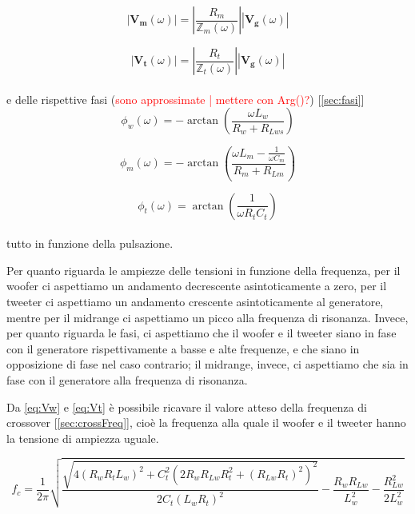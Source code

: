 \documentclass[12pt,italian]{article}
\newcommand{\err}[1]{\textcolor{red}{#1}}
\begin{document}
\begin{equation}
  \left| \mathbf{V_{m}}(\omega) \right| = \left| \frac{R_{m}}
  {\mathbb{Z}_{m}(\omega)}\right|\left| \mathbf{V_{g}}(\omega) \right|
  \label{eq:Vm}
\end{equation}

\begin{equation}
  \left| \mathbf{V_{t}}(\omega) \right| = \left| \frac{R_{t}}
  {\mathbb{Z}_{t}(\omega)}\right|\left| \mathbf{V_{g}}(\omega) \right|
  \label{eq:Vt}
\end{equation}
\\
e delle rispettive fasi (\err{sono approssimate | mettere con Arg()?}) [\ref{sec:fasi}]
\begin{equation}
  \phi_{w}(\omega) = - \arctan\left(\frac{\omega L_{w}}{R_{w}+R_{Lws}}\right)
\end{equation}

\begin{equation}
  \phi_{m}(\omega) = - \arctan\left(\frac{\omega L_{m} - \frac{1}{\omega C_{m}}}{R_{m}+R_{Lm}}\right)
\end{equation}

\begin{equation}
  \phi_{t}(\omega) = \arctan\left(\frac{1}{\omega R_{t} C_{t}}\right)
\end{equation}
\\
tutto in funzione della pulsazione.

Per quanto riguarda le ampiezze delle tensioni in funzione della frequenza, per
il woofer ci aspettiamo un andamento decrescente asintoticamente a zero, per il
tweeter ci aspettiamo un andamento crescente asintoticamente al generatore,
mentre per il midrange ci aspettiamo un picco alla frequenza di risonanza.
Invece, per quanto riguarda le fasi, ci aspettiamo che il woofer e il tweeter
siano in fase con il generatore rispettivamente a basse e alte frequenze, e che
siano in opposizione di fase nel caso contrario; il midrange, invece, ci
aspettiamo che sia in fase con il generatore alla frequenza di risonanza.

Da \eqref{eq:Vw} e \eqref{eq:Vt} è possibile ricavare il valore atteso della
frequenza di crossover [\ref{sec:crossFreq}], cioè la frequenza alla quale il
woofer e il tweeter hanno la tensione di ampiezza uguale.

\begin{equation}
  f_{c} = \frac{1}{2\pi}\sqrt{\frac{\sqrt{4 (R_{w} R_{t} L_{w})^2 + C_{t}^2(2
        R_{w} R_{Lw} R_{t}^2 + (R_{Lw} R_{t})^2)^2}}{2 C _{t} (L_{w} R_{t})^2 } -
    \frac{R_{w} R_{Lw}}{L_{w}^2} - \frac{R_{Lw}^2}{2 L_{w}^2}}
  \label{eq:fc}
\end{equation}
\end{document}
